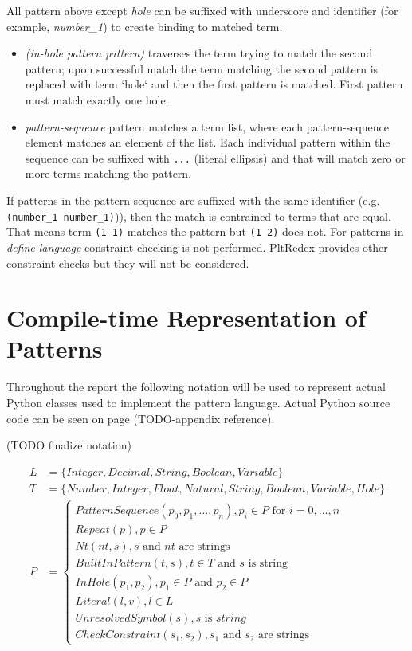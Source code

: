 All pattern above except \textit{hole} can be suffixed with underscore and identifier (for example, \textit{number\_1}) to create binding to matched term.

\begin{itemize}
\item
\textit{(in-hole pattern pattern)} traverses the term trying to match the second pattern; upon successful match the term matching the second pattern is replaced with term `hole` and then the first pattern is matched. First pattern must match exactly one hole.

\item
\textit{pattern-sequence} pattern matches a term list, where each pattern-sequence element matches an element of the list. Each individual pattern within the sequence can be suffixed with \texttt{...} (literal ellipsis) and that will match zero or more terms matching the pattern.
\end{itemize}

If patterns in the pattern-sequence are suffixed with the same identifier (e.g. \texttt{(number\_1 number\_1)})), then the match is contrained to terms that are equal. That means term \texttt{(1 1)} matches the pattern but \texttt{(1 2)} does not. For patterns in \textit{define-language} constraint checking is not performed. PltRedex provides other constraint checks but they will not be considered.

\section{Compile-time Representation of Patterns}

Throughout the report the following notation will be used to represent actual Python classes used to implement the pattern language. Actual Python source code can be seen on page (TODO-appendix reference). 

(TODO finalize notation)

\begin{align}
	L &= \{ Integer, Decimal, String, Boolean, Variable \} \\ 
	T &= \{ Number, Integer, Float, Natural, String, Boolean, Variable, Hole \} \\ 
	P &= 
	\begin{cases}
	PatternSequence(p_0, p_1, ..., p_n), p_i \in P \text { for } i=0,...,n \\ 
	Repeat(p), p \in P \\
	Nt(nt, s), s \text{ and } nt \text{ are strings} \\
	BuiltInPattern(t, s), t \in T \text{ and } s \text{ is string } \\
	InHole(p_1, p_2), p_1 \in P \text{ and } p_2 \in P \\
	Literal(l, v), l \in L \\
	UnresolvedSymbol(s), s \text{ is } string \\
	CheckConstraint(s_1, s_2), s_1 \text{ and } s_2 \text{ are strings}
	\end{cases}
\end{align}




